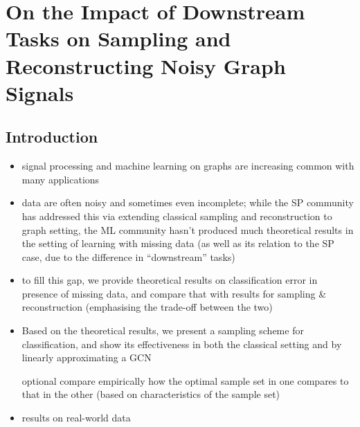 

\chapter{\label{ch:4-class_samp}On the Impact of Downstream Tasks on Sampling and Reconstructing Noisy Graph Signals}

\section{Introduction}
\iffalse
\begin{itemize}
    \item signal processing and machine learning on graphs are increasing common with many applications
    \item data are often noisy and sometimes even incomplete; while the SP community has addressed this via extending classical sampling and reconstruction to graph setting, the ML community hasn't produced much theoretical results in the setting of learning with missing data (as well as its relation to the SP case, due to the difference in ``downstream'' tasks) 
    \item to fill this gap, we provide theoretical results on classification error in presence of missing data, and compare that with results for sampling \& reconstruction (emphasising the trade-off between the two)
    \item Based on the theoretical results, we present a sampling scheme for classification, and show its effectiveness in both the classical setting and by linearly approximating a GCN
    \item [optional] compare empirically how the optimal sample set in one compares to that in the other (based on characteristics of the sample set)
    \item results on real-world data
\end{itemize}


